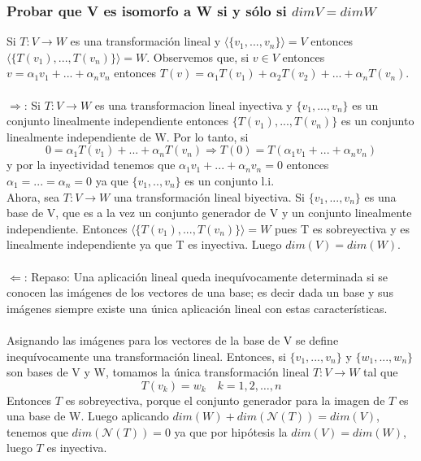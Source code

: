 \documentclass{article}
\begin{document}
\subsubsection{Probar que V es isomorfo a W si y sólo si $dim V = dim W$}
Si $T:V \rightarrow W$ es una transformación lineal y $\langle\{ v_1,...,v_n\}\rangle=V$
entonces $\langle \{ T(v_1),...,T(v_n)\}\rangle = W$. Observemos que, si
$v \in V$ entonces $v = \alpha_1v_1+...+\alpha_nv_n$ entonces $T(v) = \alpha_1T(v_1)+\alpha_2T(v_2)
+...+\alpha_nT(v_n)$. \\ \\
$\Rightarrow$: 
Si $T:V \rightarrow W$ es una transformacion lineal inyectiva y $\{ v_1,...,v_n \}$ es un conjunto
linealmente independiente entonces $\{ T(v_1),...,T(v_n)\}$ es un conjunto linealmente independiente
de W. Por lo tanto, si 
\[ 0 = \alpha_1T(v_1)+...+\alpha_nT(v_n) \Rightarrow T(0) = T(\alpha_1v_1 + ... + \alpha_nv_n)
\]
y por la inyectividad tenemos que
$\alpha_1v_1+...+\alpha_nv_n = 0$ entonces $\alpha_1=...=\alpha_n=0$ ya que $\{v_1,..,v_n\}$ es un conjunto
 l.i.
\\
Ahora, sea $T: V \rightarrow W$ una transformación lineal biyectiva. Si $\{ v_1,...,v_n \}$ es una base
de V, que es a la vez un conjunto generador de V y un conjunto linealmente independiente. Entonces 
$\langle \{ T(v_1),...,T(v_n)\} \rangle = W$ pues T es sobreyectiva y es linealmente independiente ya que
T es inyectiva. Luego $dim(V)=dim(W)$.
\\ \\
$\Leftarrow$:
Repaso: Una aplicación lineal queda inequívocamente determinada si se conocen las imágenes de los vectores
de una base; es decir dada un base y sus imágenes siempre existe una única aplicación lineal con estas
características. \\
\\
Asignando las imágenes para los vectores de la base de V se define inequívocamente una
transformación lineal. Entonces, si $\{ v_1,...,v_n \}$ y $\{ w_1,...,w_n \}$ son bases de V y W,
tomamos la única transformación lineal $T: V \rightarrow W$ tal que
\[ 
T(v_k) = w_k \quad k=1,2,\dots,n
\]
Entonces $T$ es sobreyectiva, porque el conjunto generador para la imagen de $T$ es una base de W.
Luego aplicando $dim(W) + dim(\mathcal{N}(T)) = dim(V)$, tenemos que $dim(\mathcal{N}(T)) = 0$ ya que
por hipótesis la $dim(V)=dim(W)$, luego $T$ es inyectiva.
\end{document}
